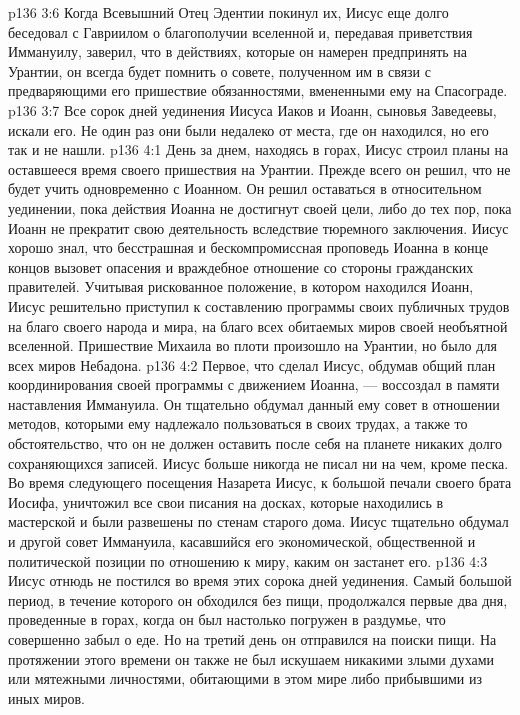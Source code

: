 \vs p136 3:6 Когда Всевышний Отец Эдентии покинул их, Иисус еще долго беседовал с Гавриилом о благополучии вселенной и, передавая приветствия Иммануилу, заверил, что в действиях, которые он намерен предпринять на Урантии, он всегда будет помнить о совете, полученном им в связи с предваряющими его пришествие обязанностями, вмененными ему на Спасограде.
\vs p136 3:7 \pc Все сорок дней уединения Иисуса Иаков и Иоанн, сыновья Заведеевы, искали его. Не один раз они были недалеко от места, где он находился, но его так и не нашли.
\vs p136 4:1 День за днем, находясь в горах, Иисус строил планы на оставшееся время своего пришествия на Урантии. Прежде всего он решил, что не будет учить одновременно с Иоанном. Он решил оставаться в относительном уединении, пока действия Иоанна не достигнут своей цели, либо до тех пор, пока Иоанн не прекратит свою деятельность вследствие тюремного заключения. Иисус хорошо знал, что бесстрашная и бескомпромиссная проповедь Иоанна в конце концов вызовет опасения и враждебное отношение со стороны гражданских правителей. Учитывая рискованное положение, в котором находился Иоанн, Иисус решительно приступил к составлению программы своих публичных трудов на благо своего народа и мира, на благо всех обитаемых миров своей необъятной вселенной. Пришествие Михаила во плоти произошло на Урантии, но было для всех миров Небадона.
\vs p136 4:2 Первое, что сделал Иисус, обдумав общий план координирования своей программы с движением Иоанна, --- воссоздал в памяти наставления Иммануила. Он тщательно обдумал данный ему совет в отношении методов, которыми ему надлежало пользоваться в своих трудах, а также то обстоятельство, что он не должен оставить после себя на планете никаких долго сохраняющихся записей. Иисус больше никогда не писал ни на чем, кроме песка. Во время следующего посещения Назарета Иисус, к большой печали своего брата Иосифа, уничтожил все свои писания на досках, которые находились в мастерской и были развешены по стенам старого дома. Иисус тщательно обдумал и другой совет Иммануила, касавшийся его экономической, общественной и политической позиции по отношению к миру, каким он застанет его.
\vs p136 4:3 \pc Иисус отнюдь не постился во время этих сорока дней уединения. Самый большой период, в течение которого он обходился без пищи, продолжался первые два дня, проведенные в горах, когда он был настолько погружен в раздумье, что совершенно забыл о еде. Но на третий день он отправился на поиски пищи. На протяжении этого времени он также не был искушаем никакими злыми духами или мятежными личностями, обитающими в этом мире либо прибывшими из иных миров.
